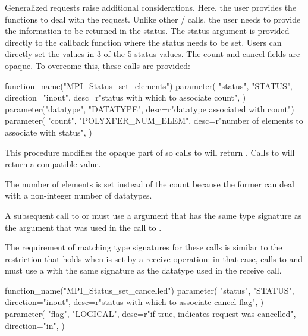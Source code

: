 Generalized requests raise additional considerations.  Here, the user
provides the functions to deal with the request.  Unlike other \mpi/
calls, the user needs to provide the information to be returned in
the status.  The status argument is provided directly to the callback
function where the status needs to be set.  Users can directly set the
values in 3 of the 5 status values.  The count and cancel fields are
opaque.  To overcome this, 
these calls 
are provided:

%
\begin{mpi-binding}
    function_name("MPI_Status_set_elements")
    parameter(
        "status",
        "STATUS",
        direction="inout",
        desc=r"status with which to associate count",
    )
    parameter("datatype", "DATATYPE", desc=r"datatype associated with count")
    parameter(
        "count",
        "POLYXFER_NUM_ELEM",
        desc=r"number of elements to associate with status",
    )
\end{mpi-binding}

This procedure modifies the opaque part of  so calls
to 
will return .
Calls to
 will return a compatible value.

\begin{rationale}
The number of elements is set instead of the count because the former
can deal with 
a 
non-integer number of datatypes.
\end{rationale}


A subsequent call to  or  must use a
 argument that has the same type signature as the
 argument that was used in the call to
.

\begin{rationale}
The requirement of matching type signatures for these calls is similar to the restriction that holds 
when 
 is set by a
receive operation: in that case, calls to
 and  must use a
 with the same signature as the datatype used in the
receive call.
\end{rationale}

%
\begin{mpi-binding}
    function_name("MPI_Status_set_cancelled")
    parameter(
        "status",
        "STATUS",
        direction="inout",
        desc=r"status with which to associate cancel flag",
    )
    parameter(
        "flag",
        "LOGICAL",
        desc=r"if true, indicates request was cancelled",
        direction="in",
    )
\end{mpi-binding}

